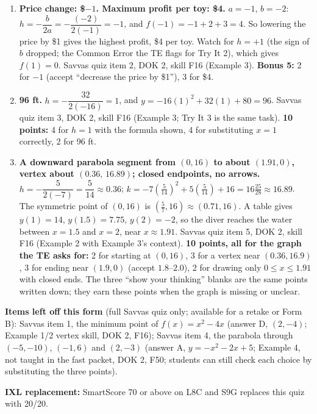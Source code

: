 \documentclass[11pt]{article}
\begin{document}
\begin{enumerate}
\item[\textbf{2.}] \textbf{Price change: \$$-1$. Maximum profit per toy: \$4.} $a=-1$, $b=-2$: $h=-\dfrac{b}{2a}=-\dfrac{(-2)}{2(-1)}=-1$, and $f(-1)=-1+2+3=4$. So lowering the price by \$1 gives the highest profit, \$4 per toy. Watch for $h=+1$ (the sign of $b$ dropped; the Common Error the TE flags for Try It 2), which gives $f(1)=0$. Savvas quiz item 2, DOK 2, skill F16 (Example 3). \textbf{Bonus 5:} 2 for $-1$ (accept ``decrease the price by \$1''), 3 for \$4.
\item[\textbf{3.}] \textbf{96 ft.} $h=-\dfrac{32}{2(-16)}=1$, and $y=-16(1)^2+32(1)+80=96$. Savvas quiz item 3, DOK 2, skill F16 (Example 3; Try It 3 is the same task). \textbf{10 points:} 4 for $h=1$ with the formula shown, 4 for substituting $x=1$ correctly, 2 for 96 ft.
\item[\textbf{5.}] \textbf{A downward parabola segment from $(0,16)$ to about $(1.91,0)$, vertex about $(0.36,\,16.89)$; closed endpoints, no arrows.} $h=-\dfrac{5}{2(-7)}=\dfrac{5}{14}\approx0.36$; $k=-7\!\left(\tfrac{5}{14}\right)^2+5\!\left(\tfrac{5}{14}\right)+16=16\tfrac{25}{28}\approx16.89$. The symmetric point of $(0,16)$ is $\left(\tfrac57,16\right)\approx(0.71,16)$. A table gives $y(1)=14$, $y(1.5)=7.75$, $y(2)=-2$, so the diver reaches the water between $x=1.5$ and $x=2$, near $x\approx1.91$. Savvas quiz item 5, DOK 2, skill F16 (Example 2 with Example 3's context). \textbf{10 points, all for the graph the TE asks for:} 2 for starting at $(0,16)$, 3 for a vertex near $(0.36,16.9)$, 3 for ending near $(1.9,0)$ (accept $1.8$--$2.0$), 2 for drawing only $0\le x\le 1.91$ with closed ends. The three ``show your thinking'' blanks are the same points written down; they earn these points when the graph is missing or unclear.
\end{enumerate}

\textbf{Items left off this form} (full Savvas quiz only; available for a retake or Form B): Savvas item 1, the minimum point of $f(x)=x^2-4x$ (answer D, $(2,-4)$; Example 1/2 vertex skill, DOK 2, F16); Savvas item 4, the parabola through $(-5,-10)$, $(-1,6)$ and $(2,-3)$ (answer A, $y=-x^2-2x+5$; Example 4, not taught in the fast packet, DOK 2, F50; students can still check each choice by substituting the three points).

\textbf{IXL replacement:} SmartScore 70 or above on L8C and S9G replaces this quiz with 20/20.
\end{document}
